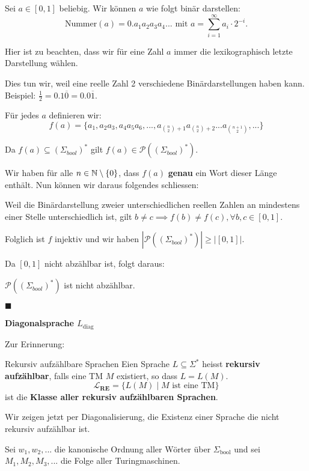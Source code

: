         Sei $a \in [0, 1]$ beliebig. Wir können $a$ wie folgt binär darstellen:
        $$\text{Nummer}(a) = 0.a_1a_2a_3a_4... \text{ mit } a = \sum_{i = 1}^{\infty} a_i\cdot 2^{-i}.$$ 
        
        Hier ist zu beachten, dass wir für eine Zahl $a$ immer die lexikographisch letzte Darstellung wählen.
    
    Dies tun wir, weil eine reelle Zahl 2 verschiedene Binärdarstellungen haben kann. Beispiel: $\frac{1}{2} = 0.1\overline{0} = 0.0\overline{1}$.
        
        Für jedes $a$ definieren wir:
        $$f(a) = \{a_1, a_2a_3, a_4a_5a_6, ..., a_{\binom{n}{2}+1}a_{\binom{n}{2}+2}...a_{\binom{n+1}{2}} , ...\}$$
    
        Da $f(a) \subseteq (\Sigma_{bool})^*$ gilt $f(a) \in \mathcal{P}((\Sigma_{bool})^*)$.
    
        Wir haben für alle $n \in \mathbb{N} \setminus\{0\}$, dass $f(a)$ \textbf{genau} ein Wort dieser Länge enthält. Nun können wir daraus folgendes schliessen:
    
        Weil die Binärdarstellung zweier unterschiedlichen reellen Zahlen an mindestens einer Stelle unterschiedlich ist, gilt $b \neq c \implies f(b) \neq f(c), \forall b,c \in [0, 1]$. 
    
        Folglich ist $f$ injektiv und wir haben $|\mathcal{P}((\Sigma_{bool})^*)| \geq |[0, 1]|$.
    
        Da $[0,1]$ nicht abzählbar ist, folgt daraus:
    
        $\mathcal{P}((\Sigma_{bool})^*)$ ist nicht abzählbar.
        
        \hspace*{0pt}\hfill$\blacksquare$



    \textbf{Diagonalsprache $L_{\text{diag}}$ }

    Zur Erinnerung:
    \begin{mainbox}{Rekursiv aufzählbare Sprachen}
        Eien Sprache $L \subseteq \Sigma^*$ heisst \textbf{rekursiv aufzählbar}, falls eine TM $M$ existiert, so dass $L = L(M)$.
        $$\mathbf{\mathcal{L}_{\textbf{RE}}} = \{L(M) \mid M \text{ ist eine TM}\}$$
        ist die \textbf{Klasse aller rekursiv aufzählbaren Sprachen}.
    \end{mainbox}
    Wir zeigen jetzt per Diagonalisierung, die Existenz einer Sprache die nicht rekursiv aufzählbar ist.


    Sei $w_1, w_2,...$ die kanonische Ordnung aller Wörter über $\Sigma_{\text{bool}}$ und sei $M_1, M_2, M_3,...$ die Folge aller Turingmaschinen.
    

